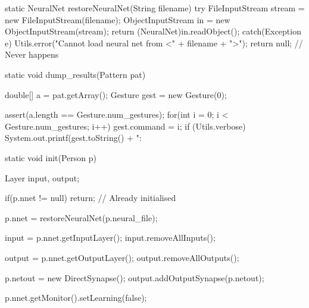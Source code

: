\documentclass[12pt,a4,notitlepage]{report}
\renewcommand{\_}{\texttt{\symbol{95}}}
\newcommand{\<}{\texttt{\symbol{60}}}
\renewcommand{\>}{\texttt{\symbol{62}}}
\begin{document}
\begin{code}
{	static NeuralNet restoreNeuralNet(String filename)
	{
		try
		{
			FileInputStream stream = new FileInputStream(filename);
			ObjectInputStream in = new ObjectInputStream(stream);
			return (NeuralNet)in.readObject();
		}
		catch(Exception e)
		{
			Utils.error("Cannot load neural net from <" + filename + ">");
		}
		return null; // Never happens
	}
	
	static void dump_results(Pattern pat)
	{
		double[] a = pat.getArray();
		Gesture gest = new Gesture(0);
		
		assert(a.length == Gesture.num_gestures);
		for(int i = 0; i < Gesture.num_gestures; i++)
		{
			gest.command = i;
			if (Utils.verbose)
				System.out.printf(gest.toString() + ": %
		}
	}
	
	static void init(Person p)
	{
		Layer input, output;

		if(p.nnet != null)
			return; // Already initialised
			
		p.nnet = restoreNeuralNet(p.neural_file);
		
		input = p.nnet.getInputLayer();
		input.removeAllInputs();
		
		output = p.nnet.getOutputLayer();
		output.removeAllOutputs();
		
		p.netout = new DirectSynapse();
		output.addOutputSynapse(p.netout);
		
		p.nnet.getMonitor().setLearning(false);
	}
}
\end{code}
\end{document}
